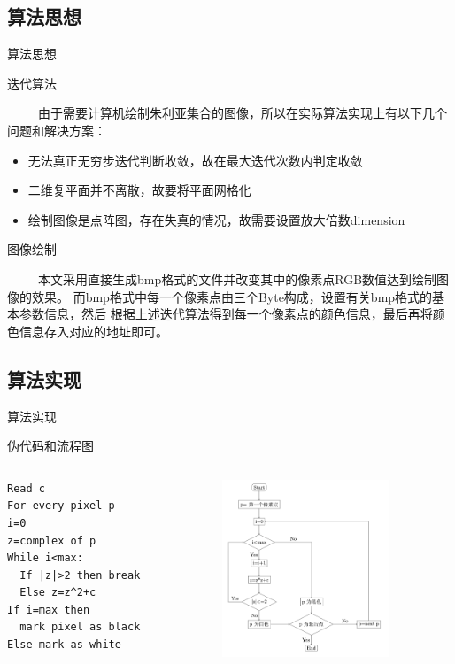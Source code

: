 \documentclass[8pt,c,compress,UTF8]{beamer}
\begin{document}
\subsection{算法思想}
\begin{frame}{算法思想}
\begin{exampleblock}{迭代算法}

\ \ \ \ \ 由于需要计算机绘制朱利亚集合的图像，所以在实际算法实现上有以下几个问题和解决方案：
\begin{itemize}
    \setlength{\itemsep}{1pt}
    \item 无法真正无穷步迭代判断收敛，故在最大迭代次数内判定收敛
    \item 二维复平面并不离散，故要将平面网格化
    \item 绘制图像是点阵图，存在失真的情况，故需要设置放大倍数dimension
\end{itemize}
\end{exampleblock}
\begin{exampleblock}{图像绘制}
\par 
\ \ \ \ \ 本文采用直接生成bmp格式的文件并改变其中的像素点RGB数值达到绘制图像的效果。
而bmp格式中每一个像素点由三个Byte构成，设置有关bmp格式的基本参数信息，然后
根据上述迭代算法得到每一个像素点的颜色信息，最后再将颜色信息存入对应的地址即可。
\end{exampleblock}
\end{frame}

\subsection{算法实现}
\begin{frame}[fragile]{算法实现}
\begin{exampleblock}{伪代码和流程图}
\end{exampleblock}
    \begin{columns}
        \begin{column}{.45\textwidth}
\begin{lstlisting}
Read c
For every pixel p
i=0
z=complex of p
While i<max:
  If |z|>2 then break
  Else z=z^2+c
If i=max then
  mark pixel as black
Else mark as white
\end{lstlisting}
        \end{column}
        \begin{column}{.5\textwidth}
            \begin{figure}[H]
                \centering
                \includegraphics[width=5cm]{../../pic/algorithm.png}
            \end{figure}
        \end{column}
    \end{columns}
\end{frame}
\end{document}
